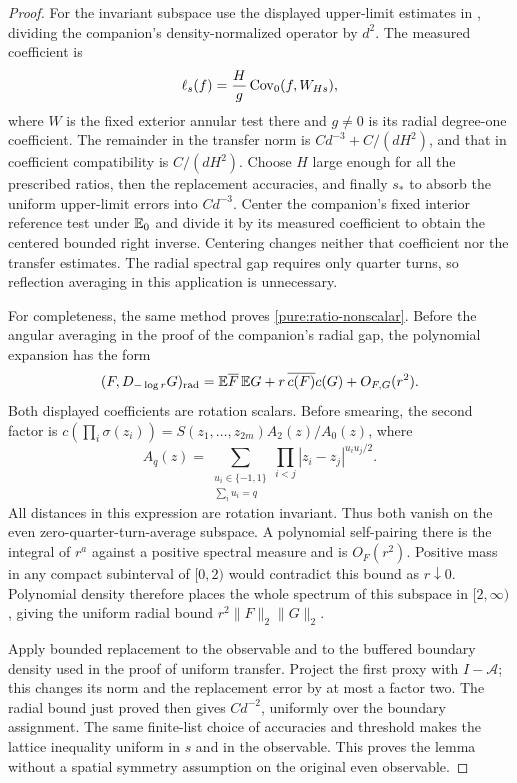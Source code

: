 \begin{proof}
For the invariant subspace use the displayed upper-limit estimates in
\cite[Section~3, ``Compatible lattice coefficients and arbitrary boundary
data'']{S}, dividing the companion's density-normalized operator by $d^2$.
The measured coefficient is
\[
 \ell_s(f)=\frac H g\operatorname{Cov}_0(f,W_{Hs}),
\]
where $W$ is the fixed exterior annular test there and $g\ne0$ is its
radial degree-one coefficient.  The remainder in the transfer norm is
$C d^{-3}+C/(dH^2)$, and that in coefficient compatibility is
$C/(dH^2)$.  Choose $H$ large enough for all the prescribed ratios, then
the replacement accuracies, and finally $s_*$ to absorb the uniform
upper-limit errors into $C d^{-3}$.  Center the companion's fixed interior
reference test under $\mathbb E_0$ and divide it by its measured coefficient to
obtain the centered bounded right inverse.  Centering changes neither
that coefficient nor the transfer estimates.  The
radial spectral gap requires only quarter turns, so reflection averaging
in this application is unnecessary.

For completeness, the same method proves \eqref{pure:ratio-nonscalar}.
Before the angular averaging in the proof of the companion's radial gap,
the polynomial expansion has the form
\[
 (F,D_{-\log r}G)_{\mathrm{rad}}
   =\mathbb E\overline F\,\mathbb E G
      +r\,\overline{c(F)}c(G)+O_{F,G}(r^2).
\]
Both displayed coefficients are rotation scalars.  Before smearing, the
second factor is
$c(\prod_i\sigma(z_i))=S(z_1,\ldots,z_{2m})A_2(z)/A_0(z)$, where
\[
 A_q(z)=\sum_{\substack{u_i\in\{-1,1\}\\\sum_i u_i=q}}
            \prod_{i<j}|z_i-z_j|^{u_i u_j/2}.
\]
All distances in this expression are rotation invariant.  Thus both vanish
on the even zero-quarter-turn-average subspace.  A polynomial self-pairing
there is the integral of $r^a$ against a positive spectral measure and is
$O_F(r^2)$.  Positive mass in any compact subinterval of $[0,2)$ would
contradict this bound as $r\downarrow0$.  Polynomial density therefore
places the whole spectrum of this subspace in $[2,\infty)$, giving the
uniform radial bound $r^2\|F\|_2\|G\|_2$.

Apply bounded replacement to the observable and to the buffered boundary
density used in the proof of uniform transfer.  Project the first proxy
with $I-\mathcal A$; this changes its norm and the replacement error by at
most a factor two.  The radial bound just proved then gives
$C d^{-2}$, uniformly over the boundary assignment.  The same finite-list
choice of accuracies and threshold makes the lattice inequality uniform
in $s$ and in the observable.  This proves the lemma without a spatial
symmetry assumption on the original even observable.
\end{proof}

